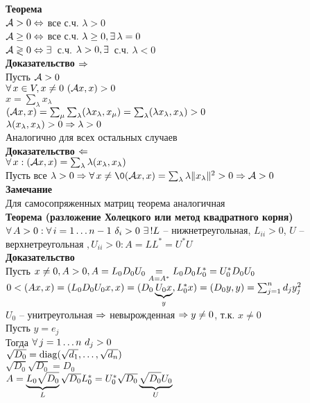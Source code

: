 \documentclass[12pt]{article}
\begin{document}
\textbf{Теорема}\\
$\mcA > 0 \LRto$ все с.ч. $\lambda > 0$\\
$\mcA \geq 0 \LRto$ все с.ч. $\lambda \geq 0, \ex \lambda = 0$\\
$\mcA \gtrless 0 \LRto \ex$ с.ч. $\lambda > 0, \ex$ с.ч. $\lambda < 0$\\
\textbf{Доказательство $\Rto$}\\
Пусть $\mcA > 0$\\
$\fall x \in V, x\neq 0\ (\mcA x, x) > 0$\\
$x = \sum_\lambda x_\lambda$\\
$(\mcA x, x) = \sum_\mu\sum_\lambda (\lambda x_\lambda, x_\mu) = \sum_\lambda (\lambda x_\lambda, x_\lambda) > 0$\\
$\lambda(x_\lambda, x_\lambda) > 0 \Rto \lambda > 0$\\
Аналогично для всех остальных случаев\\
\textbf{Доказательство $\Lto$}\\
$\fall x: (\mcA x, x) = \sum_\lambda \lambda(x_\lambda, x_\lambda)$\\
Пусть все $\lambda > 0 \Rto \fall x \neq \0 (\mcA x, x) = \sum_{\lambda} \lambda\|x_\lambda\|^2 > 0 \Rto \mcA > 0$\\
\textbf{Замечание}\\
Для самосопряженных матриц теорема аналогичная\\
\textbf{Теорема (разложение Холецкого или метод квадратного корня)}\\
$\fall A > 0: \fall i = 1\ldots n-1\ \delta_i > 0\ \ex ! L$ -- нижнетреугольная, $L_{ii} > 0$, $U$ -- верхнетреугольная $, U_{ii} > 0: A = LL^* = U^*U$\\
\textbf{Доказательство}\\
Пусть $x \neq 0, A > 0, A= L_0 D_0 U_0 \us{A=A^*}= L_0D_0L_0^* = U_0^*D_0U_0$\\
$0 < (Ax, x) = (L_0D_0U_0x, x) = (D_0\ub{y}{U_0x}, L_0^*x) = (D_0y, y) = \sum_{j=1}^n d_j y_j^2$\\
$U_0$ -- унитреугольная $\Rto$ невырожденная $\Rto y\neq 0$, т.к. $x\neq 0$\\
Пусть $y = e_j$\\
Тогда $\fall j = 1 \ldots n\ d_j > 0$\\
$\sqrt{D_0} = \nm{diag}(\sqrt{d_1}, \ldots, \sqrt{d_n})$\\
$\sqrt{D_0}\sqrt{D_0} = D_0$\\
$A = \ub{L}{L_0\sqrt{D_0}}\sqrt{D_0}L_0^* = U_0^* \sqrt{D_0}\ub{U}{\sqrt{D_0}U_0}$\\
\end{document}
